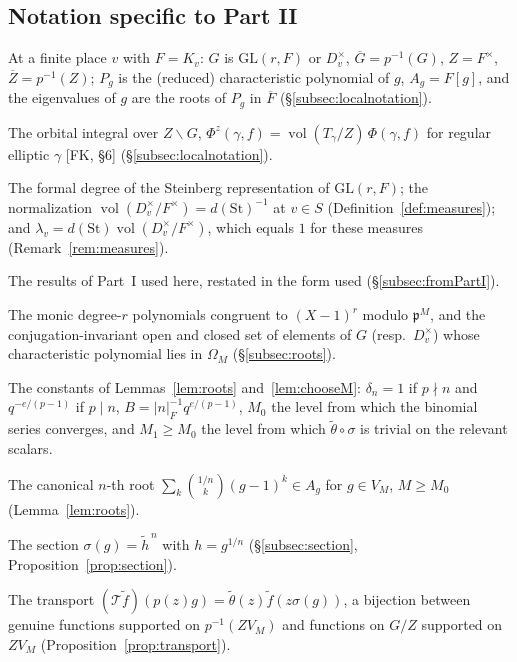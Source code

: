 \documentclass[12pt]{article}
\newcommand{\ov}[1]{\overline{#1}}
\newcommand{\fp}{\mathfrak{p}}
\newcommand{\gen}{\mathrm{gen}}
\newcommand{\vol}{\operatorname{vol}}
\newcommand{\GL}{\mathrm{GL}}
\newcommand{\St}{\mathrm{St}}
\newcommand{\Gb}{\ov{G}}
\newcommand{\Zb}{\ov{Z}}
\newcommand{\sg}{\sigma}
\theoremstyle{plain}
\theoremstyle{definition}
\begin{document}
\subsection{Notation specific to Part II}\label{subsec:glossII}
\begin{description}[style=nextline,leftmargin=1.5em]
\item[$G$, $\Gb$, $Z$, $\Zb$; $P_g$, $A_g$; eigenvalues] At a finite place $v$ with $F=K_v$: $G$ is $\GL(r,F)$ or $D_v^\times$, $\Gb=p^{-1}(G)$, $Z=F^\times$, $\Zb=p^{-1}(Z)$; $P_g$ is the (reduced) characteristic polynomial of $g$, $A_g=F[g]$, and the eigenvalues of $g$ are the roots of $P_g$ in $\ov F$ (\S\ref{subsec:localnotation}).
\item[$\Phi^z$] The orbital integral over $Z\backslash G$, $\Phi^z(\gamma,f)=\vol(T_\gamma/Z)\,\Phi(\gamma,f)$ for regular elliptic $\gamma$ [FK, \S6] (\S\ref{subsec:localnotation}).
\item[$d(\St)$, compatible measures, $\lambda_v$] The formal degree of the Steinberg representation of $\GL(r,F)$; the normalization $\vol(D_v^\times/F^\times)=d(\St)^{-1}$ at $v\in S$ (Definition~\ref{def:measures}); and $\lambda_v=d(\St)\vol(D_v^\times/F^\times)$, which equals $1$ for these measures (Remark~\ref{rem:measures}).
\item[(I1)--(I11)] The results of Part~I used here, restated in the form used (\S\ref{subsec:fromPartI}).
\item[$\Omega_M$, $V_M$, $V_{D,M}$] The monic degree-$r$ polynomials congruent to $(X-1)^r$ modulo $\fp^M$, and the conjugation-invariant open and closed set of elements of $G$ (resp.\ $D_v^\times$) whose characteristic polynomial lies in $\Omega_M$ (\S\ref{subsec:roots}).
\item[$\delta_n$, $B$, $M_0$, $M_1$] The constants of Lemmas~\ref{lem:roots} and~\ref{lem:chooseM}: $\delta_n=1$ if $p\nmid n$ and $q^{-e/(p-1)}$ if $p\mid n$, $B=|n|_F^{-1}q^{e/(p-1)}$, $M_0$ the level from which the binomial series converges, and $M_1\ge M_0$ the level from which $\tilde\theta\circ\sg$ is trivial on the relevant scalars.
\item[$g^{1/n}$] The canonical $n$-th root $\sum_k\binom{1/n}{k}(g-1)^k\in A_g$ for $g\in V_M$, $M\ge M_0$ (Lemma~\ref{lem:roots}).
\item[$\sg$, $\sg_D$, $\sg_{\GL}$] The section $\sg(g)=\tilde h^{\,n}$ with $h=g^{1/n}$ (\S\ref{subsec:section}, Proposition~\ref{prop:section}).
\item[$\mathcal T$, $\mathcal T_D$; $C_c^\infty(\Gb,\tilde\theta)_{\gen,M}$, $C_c^\infty(G/Z)_M$] The transport $(\mathcal T\tilde f)(p(z)g)=\tilde\theta(z)\tilde f(z\sg(g))$, a bijection between genuine functions supported on $p^{-1}(ZV_M)$ and functions on $G/Z$ supported on $ZV_M$ (Proposition~\ref{prop:transport}).

\end{description}
\end{document}
